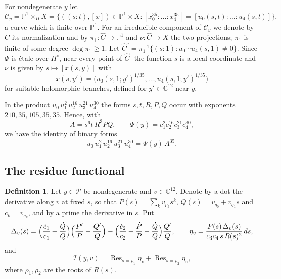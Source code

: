 \documentclass[11pt]{amsart}
\theoremstyle{definition}
\newtheorem{definition}[theorem]{Definition}
\theoremstyle{remark}
\numberwithin{equation}{section}
\newcommand{\C}{\mathbb{C}}
\newcommand{\PP}{\mathbb{P}}
\newcommand{\cP}{\mathcal{P}}
\newcommand{\cC}{\mathcal{C}}
\newcommand{\cI}{\mathcal{I}}
\newcommand{\Res}{\mathop{\mathrm{Res}}\nolimits}
\begin{document}
For nondegenerate $y$ let
\[
\cC_y=\PP^1\times_\Pi X=\{((s:t),[x])\in\PP^1\times X:[x_0^{35}:\dots:x_4^{35}]=[u_0(s,t):\dots:u_4(s,t)]\},
\]
a curve which is finite over $\PP^1$. For an irreducible component of $\cC_y$ we denote by $\widehat C$ its normalization and by $\pi_1\colon\widehat C\to\PP^1$ and $\nu\colon\widehat C\to X$ the two projections; $\pi_1$ is finite of some degree $\deg\pi_1\ge1$. Let $\widehat C^\circ=\pi_1^{-1}\{(s:1):u_0\cdots u_4(s,1)\ne0\}$. Since $\Phi$ is \'etale over $\Pi^\circ$, near every point of $\widehat C^\circ$ the function $s$ is a local coordinate and $\nu$ is given by $s\mapsto[x(s,y)]$ with
\begin{equation}\label{eq:lift}
x(s,y')=\bigl(u_0(s,1;y')^{1/35},\dots,u_4(s,1;y')^{1/35}\bigr)
\end{equation}
for suitable holomorphic branches, defined for $y'\in\C^{12}$ near $y$.

In the product $u_0\,u_1^2\,u_2^{16}\,u_3^{21}\,u_4^{30}$ the forms $s,t,R,P,Q$ occur with exponents $210,35,105,35,35$. Hence, with
\begin{equation}\label{eq:A}
A=s^6t\,R^3PQ,\qquad \Psi(y)=c_1^2c_2^{16}c_3^{21}c_4^{30},
\end{equation}
we have the identity of binary forms
\begin{equation}\label{eq:uA}
u_0\,u_1^2\,u_2^{16}\,u_3^{21}\,u_4^{30}=\Psi(y)\,A^{35}.
\end{equation}

\subsection{The residue functional}\label{subsec:I}

\begin{definition}\label{def:I}
Let $y\in\cP$ be nondegenerate and $v\in\C^{12}$. Denote by a dot the derivative along $v$ at fixed $s$, so that $\dot P(s)=\sum_kv_{p_k}s^k$, $\dot Q(s)=v_{q_0}+v_{q_1}s$ and $\dot c_k=v_{c_k}$, and by a prime the derivative in $s$. Put
\[
\Delta_v(s)=\Bigl(\frac{\dot c_1}{c_1}+\frac{\dot Q}{Q}\Bigr)\Bigl(\frac{P'}{P}-\frac{Q'}{Q}\Bigr)-\Bigl(\frac{\dot c_2}{c_2}+\frac{\dot P}{P}-\frac{\dot Q}{Q}\Bigr)\frac{Q'}{Q},\qquad \eta_v=\frac{P(s)\,\Delta_v(s)}{c_3c_4\,s\,R(s)^2}\,ds,
\]
and
\[
\cI(y,v)=\Res_{s=\rho_1}\eta_v+\Res_{s=\rho_2}\eta_v ,
\]
where $\rho_1,\rho_2$ are the roots of $R(s)$.
\end{definition}
\end{document}
